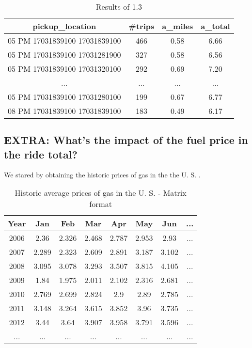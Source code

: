 \documentclass[conference,compsoc]{IEEEtran}
\begin{document}
\begin{table}[!t]
\renewcommand{\arraystretch}{1.3}
\caption{Results of 1.3}
\label{output_1_3}
\centering
\begin{tabular}{c||c|c|c}
\hline
\bfseries pickup\_location & \bfseries \#trips & \bfseries a\_miles & \bfseries a\_total \\
\hline\hline
05 PM 17031839100 17031839100 & 466 & 0.58 & 6.66 \\
05 PM 17031839100 17031281900 & 327 & 0.58 & 6.56 \\
05 PM 17031839100 17031320100 & 292 & 0.69 & 7.20 \\
... & ... & ... & ... \\
05 PM 17031839100 17031280100 & 199 & 0.67 & 6.77 \\
08 PM 17031839100 17031839100 & 183 & 0.49 & 6.17 \\

\hline
\end{tabular}
\end{table}

\subsection{EXTRA: What's the impact of the fuel price in the ride total?}
We stared by obtaining the historic prices of gas in the the U. S. \cite{IEEEhowto:oil_price}.

\begin{table}[!t]
\renewcommand{\arraystretch}{1.3}
\caption{Historic average prices of gas in the U. S. \cite{IEEEhowto:oil_price} - Matrix format}
\label{oil_prices}
\centering
\begin{tabular}{c||c|c|c|c|c|c|c}
\hline
\bfseries Year&  \bfseries Jan&  \bfseries Feb& \bfseries Mar& \bfseries Apr& \bfseries May& \bfseries Jun& \bfseries ...\\
\hline\hline
2006& 2.36&2.326&2.468&2.787&2.953& 2.93&...\\
2007&2.289&2.323&2.609&2.891&3.187&3.102&...\\
2008&3.095&3.078&3.293&3.507&3.815&4.105&...\\
2009& 1.84&1.975&2.011&2.102&2.316&2.681&...\\
2010&2.769&2.699&2.824&  2.9& 2.89&2.785&...\\
2011&3.148&3.264&3.615&3.852& 3.96&3.735&...\\
2012& 3.44& 3.64&3.907&3.958&3.791&3.596&...\\
...&...&...&...&...&...&...&...\\
\hline
\end{tabular}
\end{table}
\end{document}
